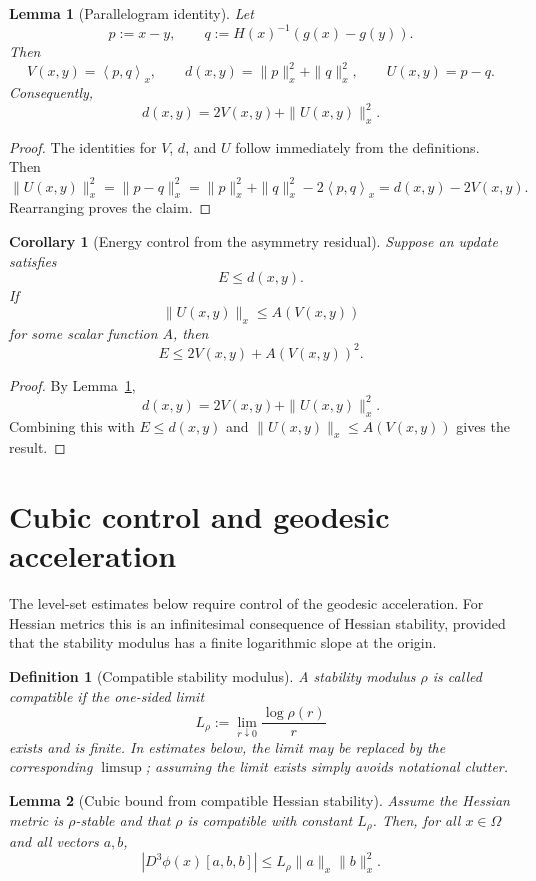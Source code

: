 \documentclass[11pt]{article}
\newtheorem{definition}{Definition}
\newtheorem{lemma}{Lemma}
\newtheorem{corollary}{Corollary}
\newcommand{\ipx}[2]{\left\langle #1,#2\right\rangle_x}
\begin{document}
\begin{lemma}[Parallelogram identity]\label{lem:parallelogram}
Let
\[
    p:=x-y,
    \qquad
    q:=H(x)^{-1}(g(x)-g(y)).
\]
Then
\[
    V(x,y)=\ipx{p}{q},
    \qquad
    d(x,y)=\|p\|_x^2+\|q\|_x^2,
    \qquad
    U(x,y)=p-q.
\]
Consequently,
\[
    d(x,y)=2V(x,y)+\|U(x,y)\|_x^2.
\]
\end{lemma}

\begin{proof}
The identities for \(V\), \(d\), and \(U\) follow immediately from the definitions. Then
\[
    \|U(x,y)\|_x^2
    =
    \|p-q\|_x^2
    =
    \|p\|_x^2+\|q\|_x^2-2\ipx{p}{q}
    =
    d(x,y)-2V(x,y).
\]
Rearranging proves the claim.
\end{proof}

\begin{corollary}[Energy control from the asymmetry residual]\label{cor:energy-control}
Suppose an update satisfies
\[
    E\le d(x,y).
\]
If
\[
    \|U(x,y)\|_x\le A(V(x,y))
\]
for some scalar function \(A\), then
\[
    E\le 2V(x,y)+A(V(x,y))^2.
\]
\end{corollary}

\begin{proof}
By Lemma~\ref{lem:parallelogram},
\[
    d(x,y)=2V(x,y)+\|U(x,y)\|_x^2.
\]
Combining this with \(E\le d(x,y)\) and \(\|U(x,y)\|_x\le A(V(x,y))\) gives the result.
\end{proof}


\section{Cubic control and geodesic acceleration}

The level-set estimates below require control of the geodesic acceleration.  For
Hessian metrics this is an infinitesimal consequence of Hessian stability, provided
that the stability modulus has a finite logarithmic slope at the origin.

\begin{definition}[Compatible stability modulus]\label{def:compatible-modulus}
A stability modulus \(\rho\) is called \emph{compatible} if the one-sided limit
\[
    L_\rho
    :=
    \lim_{r\downarrow0}\frac{\log \rho(r)}{r}
\]
exists and is finite.  In estimates below, the limit may be replaced by the
corresponding \(\limsup\); assuming the limit exists simply avoids notational
clutter.
\end{definition}

\begin{lemma}[Cubic bound from compatible Hessian stability]\label{lem:rho-to-cubic}
Assume the Hessian metric is \(\rho\)-stable and that \(\rho\) is compatible with
constant \(L_\rho\).  Then, for all \(x\in\Omega\) and all vectors \(a,b\),
\[
    |D^3\phi(x)[a,b,b]|
    \le
    L_\rho\|a\|_x\|b\|_x^2.
\]
\end{lemma}
\end{document}
